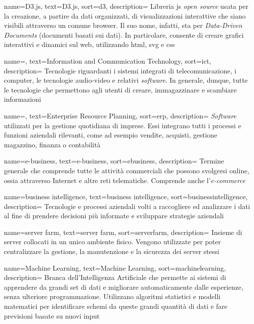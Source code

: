  {
    name=D3.js,
    text=D3.js,
    sort=d3,
    description=
    {Libreria \gls{js} \emph{open source} usata per la creazione, a partire da dati organizzati, di visualizzazioni interattive che siano visibili attraverso un comune browser.
    Il suo nome, infatti, sta per \emph{Data-Driven Documents} (documenti basati sui dati). 
    In particolare, consente di creare grafici interattivi e dinamici sul web, utilizzando \gls{html}, \gls{svg} e \gls{css}}
}

 {
    name=,
    text=Information and Communication Technology,
    sort=ict,
    description=
    {Tecnologie riguardanti i sistemi integrati di telecomunicazione, i computer, le tecnologie audio-video e relativi \emph{software}.
    In generale, dunque, tutte le tecnologie che permettono agli utenti di creare, immagazzinare e scambiare informazioni}
}

 {
    name=,
    text=Enterprise Resource Planning,
    sort=erp,
    description=
    {\emph{Software} utilizzati per la gestione quotidiana di imprese.
    Essi integrano tutti i processi e funzioni aziendali rilevanti, come ad esempio vendite, acquisti, gestione magazzino, finanza o contabilità}
}

 {
    name=e-business,
    text=e-business,
    sort=ebusiness,
    description=
    {Termine generale che comprende tutte le attività commerciali che possono svolgersi online, ossia attraverso 
    Internet e altre reti telematiche. Comprende anche l'\emph{e-commerce}}
}

 {
    name=business intelligence,
    text=business intelligence,
    sort=businessintelligence,
    description=
    {Tecnologie e processi aziendali volti a raccogliere ed analizzare i dati al fine di prendere decisioni più informate e 
    sviluppare strategie aziendali}
}

 {
    name=server farm,
    text=server farm,
    sort=serverfarm,
    description=
    {Insieme di server collocati in un unico ambiente fisico.
    Vengono utilizzate per poter centralizzare la gestione, la manutenzione e la sicurezza dei server stessi}
}

 {
    name=Machine Learning,
    text=Machine Learning,
    sort=machinelearning,
    description=
    {Branca dell'Intelligenza Artificiale che permette ai sistemi
    di apprendere da grandi set di dati e migliorare automaticamente dalle esperienze, senza ulteriore programmazione. 
    Utilizzano algoritmi statistici e modelli matematici per identificare schemi da queste grandi quantità di dati e fare
    previsioni basate su nuovi input}
}

